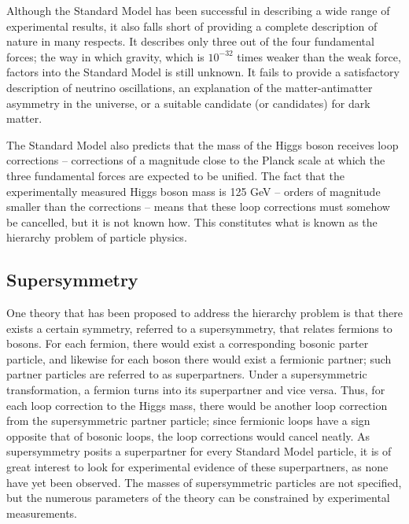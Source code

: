 Although the Standard Model has been successful in describing a wide range of experimental results, it also falls short of providing a complete description of nature in many respects. It describes only three out of the four fundamental forces; the way in which gravity, which is $10^{-32}$ times weaker than the weak force, factors into the Standard Model is still unknown. It fails to provide a satisfactory description of neutrino oscillations, an explanation of the matter-antimatter asymmetry in the universe, or a suitable candidate (or candidates) for dark matter.

The Standard Model also predicts that the mass of the Higgs boson receives loop corrections -- corrections of a magnitude close to the Planck scale at which the three fundamental forces are expected to be unified. The fact that the experimentally measured Higgs boson mass is 125 GeV -- orders of magnitude smaller than the corrections -- means that these loop corrections must somehow be cancelled, but it is not known how. This constitutes what is known as the hierarchy problem of particle physics.

\subsection{Supersymmetry}

One theory that has been proposed to address the hierarchy problem is that there exists a certain symmetry, referred to a supersymmetry, that relates fermions to bosons. For each fermion, there would exist a corresponding bosonic parter particle, and likewise for each boson there would exist a fermionic partner; such partner particles are referred to as superpartners. Under a supersymmetric transformation, a fermion turns into its superpartner and vice versa. Thus, for each loop correction to the Higgs mass, there would be another loop correction from the supersymmetric partner particle; since fermionic loops have a sign opposite that of bosonic loops, the loop corrections would cancel neatly.
As supersymmetry posits a superpartner for every Standard Model particle, it is of great interest to look for experimental evidence of these superpartners, as none have yet been observed. The masses of supersymmetric particles are not specified, but the numerous parameters of the theory can be constrained by experimental measurements.

